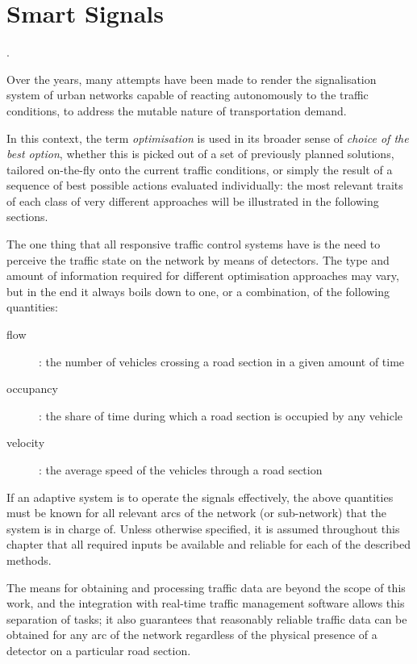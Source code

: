 \chapter{Smart Signals}
.

Over the years, many attempts have been made to render the signalisation system of urban networks capable of reacting autonomously to the traffic conditions, to address the mutable nature of transportation demand.

In this context, the term \emph{optimisation} is used in its broader sense of \emph{choice of the best option}, whether this is picked out of a set of previously planned solutions, tailored on-the-fly onto the current traffic conditions, or simply the result of a sequence of best possible actions evaluated individually: the most relevant traits of each class of very different approaches will be illustrated in the following sections.

The one thing that all responsive traffic control systems have is the need to perceive the traffic state on the network by means of detectors. The type and amount of information required for different optimisation approaches may vary, but in the end it always boils down to one, or a combination, of the following quantities:
\begin{description}
\item[flow]: the number of vehicles crossing a road section in a given amount of time 
\item[occupancy]: the share of time during which a road section is occupied by any vehicle \units{\%}
\item[velocity]: the average speed of the vehicles through a road section 
\end{description}
If an adaptive system is to operate the signals effectively, the above quantities must be known for all relevant arcs of the network (or sub-network) that the system is in charge of. Unless otherwise specified, it is assumed throughout this chapter that all required inputs be available and reliable for each of the described methods.

The means for obtaining and processing traffic data are beyond the scope of this work, and the integration with real-time traffic management software allows this separation of tasks; it also guarantees that reasonably reliable traffic data can be obtained for any arc of the network regardless of the physical presence of a detector on a particular road section.


